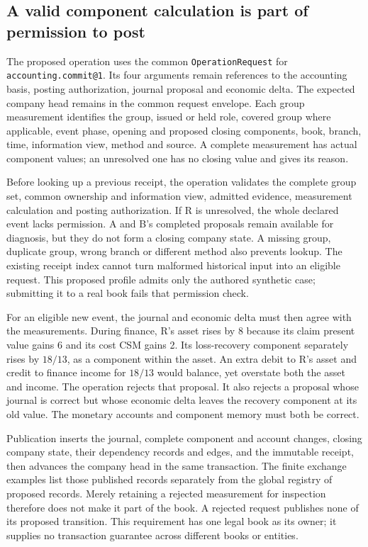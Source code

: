 \subsection*{A valid component calculation is part of permission to post}

The proposed operation uses the common
\texttt{OperationRequest} for \texttt{accounting.commit@1}. Its four arguments
remain references to the accounting basis, posting authorization, journal
proposal and economic delta. The expected company head remains in the
common request envelope. Each group measurement identifies the group,
issued or held role, covered group where applicable, event phase, opening
and proposed closing components, book, branch, time, information view,
method and source. A complete measurement has actual component values;
an unresolved one has no closing value and gives its reason.

Before looking up a previous receipt, the operation validates the complete
group set, common ownership and information view, admitted evidence,
measurement calculation and posting authorization. If R is unresolved,
the whole declared event lacks permission. A and B's completed proposals
remain available for diagnosis, but they do not form a closing company
state. A missing group, duplicate group, wrong branch or different method
also prevents lookup. The existing receipt index cannot turn malformed
historical input into an eligible request. This proposed profile admits
only the authored synthetic case; submitting it to a real book fails that
permission check.

For an eligible new event, the journal and economic delta must then agree
with the measurements. During finance, R's asset rises by 8 because its
claim present value gains 6 and its cost CSM gains 2. Its loss-recovery
component separately rises by \(18/13\), as a component within the asset.
An extra debit to R's asset and credit to finance income for \(18/13\)
would balance, yet overstate both the asset and income. The operation
rejects that proposal. It also rejects a proposal whose journal is correct
but whose economic delta leaves the recovery component at its old value.
The monetary accounts and component memory must both be correct.

Publication inserts the journal, complete component and account changes,
closing company state, their dependency records and edges, and the immutable
receipt, then advances the company head in the same transaction. The finite
exchange examples list those published records separately from the global
registry of proposed records. Merely retaining a rejected measurement for
inspection therefore does not make it part of the book. A rejected request
publishes none of its proposed transition. This requirement has one legal
book as its owner; it supplies no transaction guarantee across different
books or entities.

